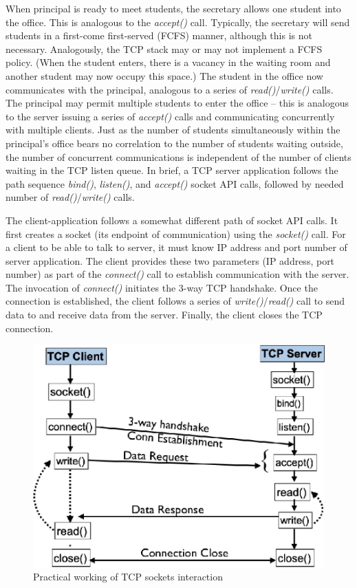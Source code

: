 \begin{multicols}{2}
\begin{figure}[H]
\vspace{-.4cm}

\end{figure}

When principal is ready to meet students, the secretary allows one student into the office. This is analogous to the \textit{accept()} call. Typically, the secretary will send students in a first-come first-served (FCFS) manner, although this is not necessary. Analogously, the TCP stack may or may not implement a FCFS policy. (When the student enters, there is a vacancy in the waiting room and another student may now occupy this space.) The student in the office now communicates with the principal, analogous to a series of \textit{read()}/\textit{write()} calls. The principal may permit multiple students to enter the office – this is analogous to the server issuing a series of \textit{accept()} calls and communicating concurrently with multiple clients. Just as the number of students simultaneously within the principal’s office bears no correlation to the number of students waiting outside, the number of concurrent communications is independent of the number of clients waiting in the TCP listen queue. In brief, a TCP server application follows the path sequence \textit{bind()}, \textit{listen()}, and \textit{accept()} socket API calls, followed by needed number of \textit{read()}/\textit{write()} calls. 

The client-application follows a somewhat different path of socket API calls. It first creates a socket (its endpoint of communication) using the \textit{socket()} call. For a client to be able to talk to server, it must know IP address and port number of server application. The client provides these two parameters (IP address, port number) as part of the \textit{connect()} call to establish communication with the server. The invocation of \textit{connect()} initiates the 3-way TCP handshake. Once the connection is established, the client follows a series of \textit{write()}/\textit{read()} call to send data to and receive data from the server. Finally, the client closes the TCP connection.

\begin{figure}[H]
\centering
\includegraphics[scale=2.3]{src/Figures/chap1/fig02.jpg}
\caption{Practical working of TCP sockets interaction}\label{fig02}


\end{figure}
\end{multicols}
